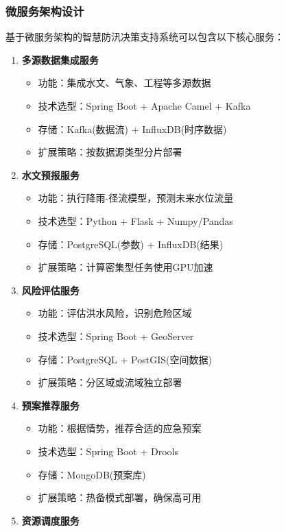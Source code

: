 \subsubsection{微服务架构设计}\label{ux5faeux670dux52a1ux67b6ux6784ux8bbeux8ba1-3}

基于微服务架构的智慧防汛决策支持系统可以包含以下核心服务：

\begin{enumerate}
\def\labelenumi{\arabic{enumi}.}
\tightlist
\item
  \textbf{多源数据集成服务}

  \begin{itemize}
  \tightlist
  \item
    功能：集成水文、气象、工程等多源数据
  \item
    技术选型：Spring Boot + Apache Camel + Kafka
  \item
    存储：Kafka(数据流) + InfluxDB(时序数据)
  \item
    扩展策略：按数据源类型分片部署
  \end{itemize}
\item
  \textbf{水文预报服务}

  \begin{itemize}
  \tightlist
  \item
    功能：执行降雨-径流模型，预测未来水位流量
  \item
    技术选型：Python + Flask + Numpy/Pandas
  \item
    存储：PostgreSQL(参数) + InfluxDB(结果)
  \item
    扩展策略：计算密集型任务使用GPU加速
  \end{itemize}
\item
  \textbf{风险评估服务}

  \begin{itemize}
  \tightlist
  \item
    功能：评估洪水风险，识别危险区域
  \item
    技术选型：Spring Boot + GeoServer
  \item
    存储：PostgreSQL + PostGIS(空间数据)
  \item
    扩展策略：分区域或流域独立部署
  \end{itemize}
\item
  \textbf{预案推荐服务}

  \begin{itemize}
  \tightlist
  \item
    功能：根据情势，推荐合适的应急预案
  \item
    技术选型：Spring Boot + Drools
  \item
    存储：MongoDB(预案库)
  \item
    扩展策略：热备模式部署，确保高可用
  \end{itemize}
\item
  \textbf{资源调度服务}


\end{enumerate}
